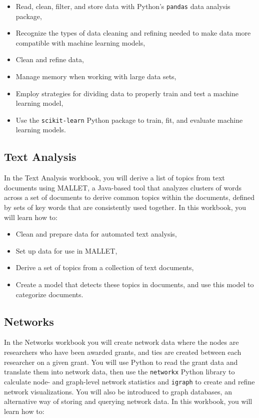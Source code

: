 \documentclass[]{krantz}
\begin{document}
\begin{itemize}
\item
  Read, clean, filter, and store data with Python's \texttt{pandas} data
  analysis package,
\item
  Recognize the types of data cleaning and refining needed to make data
  more compatible with machine learning models,
\item
  Clean and refine data,
\item
  Manage memory when working with large data sets,
\item
  Employ strategies for dividing data to properly train and test a
  machine learning model,
\item
  Use the \texttt{scikit-learn} Python package to train, fit, and
  evaluate machine learning models.
\end{itemize}

\subsection{Text Analysis}\label{text-analysis-1}

In the Text Analysis workbook, you will derive a list of topics from
text documents using MALLET, a Java-based tool that analyzes clusters of
words across a set of documents to derive common topics within the
documents, defined by sets of key words that are consistently used
together. In this workbook, you will learn how to:

\begin{itemize}
\item
  Clean and prepare data for automated text analysis,
\item
  Set up data for use in MALLET,
\item
  Derive a set of topics from a collection of text documents,
\item
  Create a model that detects these topics in documents, and use this
  model to categorize documents.
\end{itemize}

\subsection{Networks}\label{networks}

In the Networks workbook you will create network data where the nodes
are researchers who have been awarded grants, and ties are created
between each researcher on a given grant. You will use Python to read
the grant data and translate them into network data, then use the
\texttt{networkx} Python library to calculate node- and graph-level
network statistics and \texttt{igraph} to create and refine network
visualizations. You will also be introduced to graph databases, an
alternative way of storing and querying network data. In this workbook,
you will learn how to:
\end{document}
